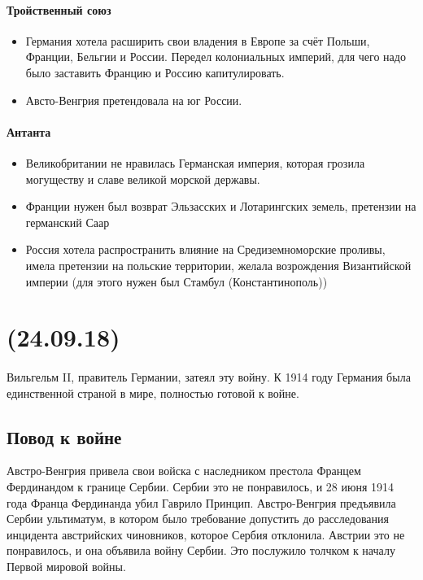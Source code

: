 \documentclass[dvipdfmx]{article}
\begin{document}
\paragraph{Тройственный союз}
\begin{itemize}
\item
  Германия хотела расширить свои владения в Европе за счёт Польши, Франции, Бельгии и России.
  Передел колониальных империй, для чего надо было заставить Францию и Россию капитулировать.
\item
  Австо-Венгрия претендовала на юг России.
\end{itemize}
\paragraph{Антанта}
\begin{itemize}
\item
  Великобритании не нравилась Германская империя, которая грозила могуществу и славе великой морской державы.
\item
  Франции нужен был возврат Эльзасских и Лотарингских земель, претензии на германский Саар
\item
  Россия хотела распространить влияние на Средиземноморские проливы, имела претензии на польские территории, желала
  возрождения Византийской империи (для этого нужен был Стамбул (Константинополь))
\end{itemize}

\newpage
\noindent\makebox[\linewidth]{\rule{\paperwidth}{0.4pt}}
\section{(24.09.18)}
\noindent\makebox[\linewidth]{\rule{\paperwidth}{0.4pt}}
\paragraph{}

Вильгельм II, правитель Германии, затеял эту войну. К 1914 году Германия была единственной страной в мире,
полностью готовой к войне.

\subsection{Повод к войне}
Австро-Венгрия привела свои войска с наследником престола Францем Фердинандом к границе Сербии.
Сербии это не понравилось, и 28 июня 1914 года Франца Фердинанда убил Гаврило Принцип.
Австро-Венгрия предъявила Сербии ультиматум, в котором было требование допустить до расследования
инцидента австрийских чиновников, которое Сербия отклонила. Австрии это не понравилось, и она объявила
войну Сербии. Это послужило толчком к началу Первой мировой войны.
\end{document}
